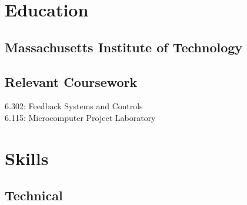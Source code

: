 \documentclass[letterpaper, article]{deedy-resume-openfont}
\begin{document}
\hfill
%
%
\begin{minipage}[t]{0.33\textwidth} 

\vspace{\topsep}


\section{Education} 

\subsection{Massachusetts Institute of Technology \hfill}
\sectionsep

\subsection{Relevant Coursework \hfill}
\vspace{.05cm}
6.302: Feedback Systems and Controls\\
6.115: Microcomputer Project Laboratory \\




\section{Skills}
\subsection{Technical}


\end{minipage}
\end{document}
